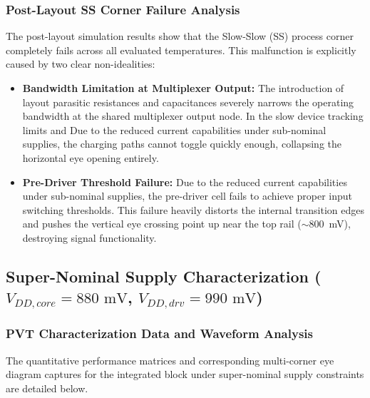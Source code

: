 \clearpage

\subsubsection*{Post-Layout SS Corner Failure Analysis}

The post-layout simulation results show that the Slow-Slow (SS) process corner completely fails across all evaluated temperatures. This malfunction is explicitly caused by two clear non-idealities:
\begin{itemize}
    \item \textbf{Bandwidth Limitation at Multiplexer Output:} The introduction of layout parasitic resistances and capacitances severely narrows the operating bandwidth at the shared multiplexer output node. In the slow device tracking limits and Due to the reduced current capabilities under sub-nominal supplies, the charging paths cannot toggle quickly enough, collapsing the horizontal eye opening entirely.
    \item \textbf{Pre-Driver Threshold Failure:} Due to the reduced current capabilities under sub-nominal supplies, the pre-driver cell fails to achieve proper input switching thresholds. This failure heavily distorts the internal transition edges and pushes the vertical eye crossing point up near the top rail ($\sim$800~mV), destroying signal functionality.
\end{itemize}

\subsection*{Super-Nominal Supply Characterization ($V_{DD,core} = 880\text{ mV}$, $V_{DD,drv} = 990\text{ mV}$)}
\subsubsection*{PVT Characterization Data and Waveform Analysis}

The quantitative performance matrices and corresponding multi-corner eye diagram captures for the integrated block under super-nominal supply constraints are detailed below.

